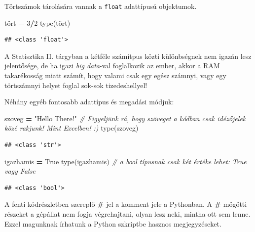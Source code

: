 \documentclass[
]{book}
\newenvironment{Shaded}{\begin{snugshade}}{\end{snugshade}}
\newcommand{\BuiltInTok}[1]{#1}
\newcommand{\CommentTok}[1]{\textcolor[rgb]{0.56,0.35,0.01}{\textit{#1}}}
\newcommand{\DecValTok}[1]{\textcolor[rgb]{0.00,0.00,0.81}{#1}}
\newcommand{\NormalTok}[1]{#1}
\newcommand{\OperatorTok}[1]{\textcolor[rgb]{0.81,0.36,0.00}{\textbf{#1}}}
\newcommand{\StringTok}[1]{\textcolor[rgb]{0.31,0.60,0.02}{#1}}
\newcommand{\VariableTok}[1]{\textcolor[rgb]{0.00,0.00,0.00}{#1}}
\begin{document}
Törtszámok tárolására vannak a \texttt{float} adattípusú objektumok.

\begin{Shaded}
\begin{Highlighting}[]
\NormalTok{tört }\OperatorTok{=} \DecValTok{3}\OperatorTok{/}\DecValTok{2}
\BuiltInTok{type}\NormalTok{(tört)}
\end{Highlighting}
\end{Shaded}

\begin{verbatim}
## <class 'float'>
\end{verbatim}

A Statisztika II. tárgyban a kétféle számítpus közti különbségnek nem igazán lesz jelentősége, de ha igazi \emph{big data}-val foglalkozik az ember, akkor a RAM takarékosság miatt számít, hogy valami csak egy egész számnyi, vagy egy törtszámnyi helyet foglal sok-sok tizedeshellyel!

Néhány egyéb fontosabb adattípus és megadási módjuk:

\begin{Shaded}
\begin{Highlighting}[]
\NormalTok{szoveg }\OperatorTok{=} \StringTok{"Hello There!"} \CommentTok{\# Figyeljünk rá, hogy szöveget a kódban csak idézőjelek közé rakjunk! Mint Excelben! :)}
\BuiltInTok{type}\NormalTok{(szoveg)}
\end{Highlighting}
\end{Shaded}

\begin{verbatim}
## <class 'str'>
\end{verbatim}

\begin{Shaded}
\begin{Highlighting}[]
\NormalTok{igazhamis }\OperatorTok{=} \VariableTok{True}
\BuiltInTok{type}\NormalTok{(igazhamis) }\CommentTok{\# a bool típusnak csak két értéke lehet: True vagy False}
\end{Highlighting}
\end{Shaded}

\begin{verbatim}
## <class 'bool'>
\end{verbatim}

A fenti kódrészletben szereplő \textbf{\#} jel a komment jele a Pythonban. A \textbf{\#} mögötti részeket a gépállat nem fogja végrehajtani, olyan lesz neki, mintha ott sem lenne. Ezzel magunknak írhatunk a Python szkriptbe hasznos megjegyzéseket.
\end{document}
